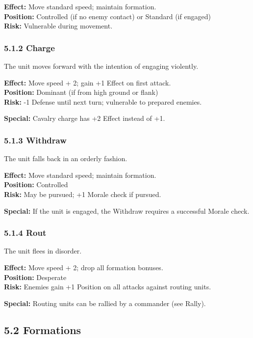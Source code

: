 \documentclass[11pt]{article}
\begin{document}
\textbf{Effect:} Move standard speed; maintain formation.\\
\textbf{Position:} Controlled (if no enemy contact) or Standard (if engaged)\\
\textbf{Risk:} Vulnerable during movement.

\subsubsection{5.1.2 Charge}

The unit moves forward with the intention of engaging violently.

\textbf{Effect:} Move speed + 2; gain +1 Effect on first attack.\\
\textbf{Position:} Dominant (if from high ground or flank)\\
\textbf{Risk:} -1 Defense until next turn; vulnerable to prepared enemies.

\textbf{Special:} Cavalry charge has +2 Effect instead of +1.

\subsubsection{5.1.3 Withdraw}

The unit falls back in an orderly fashion.

\textbf{Effect:} Move standard speed; maintain formation.\\
\textbf{Position:} Controlled\\
\textbf{Risk:} May be pursued; +1 Morale check if pursued.

\textbf{Special:} If the unit is engaged, the Withdraw requires a successful Morale check.

\subsubsection{5.1.4 Rout}

The unit flees in disorder.

\textbf{Effect:} Move speed + 2; drop all formation bonuses.\\
\textbf{Position:} Desperate\\
\textbf{Risk:} Enemies gain +1 Position on all attacks against routing units.

\textbf{Special:} Routing units can be rallied by a commander (see Rally).

\subsection{5.2 Formations}
\end{document}
